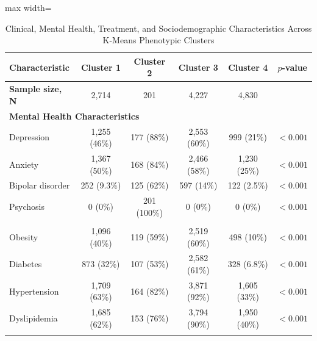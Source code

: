 \documentclass[11pt]{article}
\begin{document}
\begin{table}[H]
\centering
\caption{Clinical, Mental Health, Treatment, and Sociodemographic Characteristics Across K-Means Phenotypic Clusters}
\label{tab:clusters}

\small

\begin{adjustbox}{max width=\textwidth}
\begin{tabular}{lccccc}
\toprule
\textbf{Characteristic} &
\textbf{Cluster 1} &
\textbf{Cluster 2} &
\textbf{Cluster 3} &
\textbf{Cluster 4} &
\textbf{$p$-value} \\
\midrule

\textbf{Sample size, N} &
2,714 &
201 &
4,227 &
4,830 &
\\

\midrule

\multicolumn{6}{l}{\textbf{Mental Health Characteristics}} \\

Depression &
1,255 (46\%) &
177 (88\%) &
2,553 (60\%) &
999 (21\%) &
$<0.001$ \\

Anxiety &
1,367 (50\%) &
168 (84\%) &
2,466 (58\%) &
1,230 (25\%) &
$<0.001$ \\

Bipolar disorder &
252 (9.3\%) &
125 (62\%) &
597 (14\%) &
122 (2.5\%) &
$<0.001$ \\

Psychosis &
0 (0\%) &
201 (100\%) &
0 (0\%) &
0 (0\%) &
$<0.001$ \\

\addlinespace

\multicolumn{6}{l}{\textbf{Metabolic Characteristics}} \\

Obesity &
1,096 (40\%) &
119 (59\%) &
2,519 (60\%) &
498 (10\%) &
$<0.001$ \\

Diabetes &
873 (32\%) &
107 (53\%) &
2,582 (61\%) &
328 (6.8\%) &
$<0.001$ \\

Hypertension &
1,709 (63\%) &
164 (82\%) &
3,871 (92\%) &
1,605 (33\%) &
$<0.001$ \\

Dyslipidemia &
1,685 (62\%) &
153 (76\%) &
3,794 (90\%) &
1,950 (40\%) &
$<0.001$ \\

\addlinespace

\multicolumn{6}{l}{\textbf{Treatment Characteristics}} \\


\end{tabular}
\end{adjustbox}
\end{table}
\end{document}
